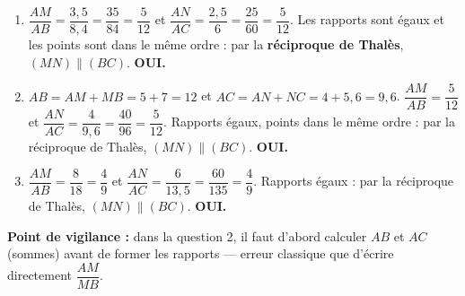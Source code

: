 \documentclass[11pt]{article}
\begin{document}
\begin{corrige}
\begin{enumerate}
    \item $\dfrac{AM}{AB} = \dfrac{3,5}{8,4} = \dfrac{35}{84} = \dfrac{5}{12}$ et $\dfrac{AN}{AC} = \dfrac{2,5}{6} = \dfrac{25}{60} = \dfrac{5}{12}$.
    Les rapports sont égaux et les points sont dans le même ordre : par la \textbf{réciproque de Thalès}, $(MN) \parallel (BC)$. \textbf{OUI.}
    \item $AB = AM + MB = 5 + 7 = 12$ et $AC = AN + NC = 4 + 5,6 = 9,6$.
    $\dfrac{AM}{AB} = \dfrac{5}{12}$ et $\dfrac{AN}{AC} = \dfrac{4}{9,6} = \dfrac{40}{96} = \dfrac{5}{12}$.
    Rapports égaux, points dans le même ordre : par la réciproque de Thalès, $(MN) \parallel (BC)$. \textbf{OUI.}
    \item $\dfrac{AM}{AB} = \dfrac{8}{18} = \dfrac{4}{9}$ et $\dfrac{AN}{AC} = \dfrac{6}{13,5} = \dfrac{60}{135} = \dfrac{4}{9}$.
    Rapports égaux : par la réciproque de Thalès, $(MN) \parallel (BC)$. \textbf{OUI.}
\end{enumerate}
\textbf{Point de vigilance :} dans la question 2, il faut d'abord calculer $AB$ et $AC$ (sommes) avant de former les rapports — erreur classique que d'écrire directement $\dfrac{AM}{MB}$.
\end{corrige}
\end{document}
